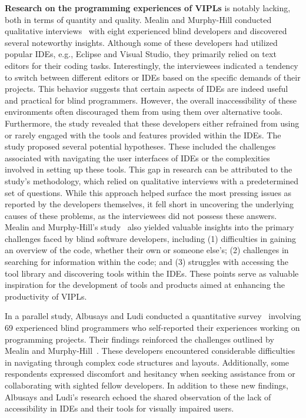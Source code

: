 {\bf Research on the programming experiences of VIPLs} is notably
lacking, both in terms of quantity and quality. Mealin and Murphy-Hill
conducted qualitative interviews~\cite{mealin-vlhcc12} with eight experienced blind
developers and discovered several noteworthy insights. Although some
of these developers had utilized popular IDEs, e.g., Eclipse and
Visual Studio, they primarily relied on text editors for their coding
tasks. Interestingly, the interviewees indicated a tendency to switch
between different editors or IDEs based on the specific demands of
their projects. This behavior suggests that certain aspects of IDEs
are indeed useful and practical for blind programmers. However, the
overall inaccessibility of these environments often discouraged them
from using them over alternative tools.
Furthermore, the study revealed that these developers either refrained
from using or rarely engaged with the tools and features provided
within the IDEs.
The study proposed several potential hypotheses. These included the
challenges associated with navigating the user interfaces of IDEs or
the complexities involved in setting up these tools. This gap in
research can be attributed to the study's methodology, which relied on
qualitative interviews with a predetermined set of questions. While
this approach helped surface the most pressing issues as reported by
the developers themselves, it fell short in uncovering the underlying
causes of these problems, as the interviewees did not possess these
answers.
Mealin and Murphy-Hill's study~\cite{mealin-vlhcc12} also yielded valuable insights into
the primary challenges faced by blind software developers, including
(1) difficulties in gaining an overview of the code, whether their own
or someone else's; (2) challenges in searching for information within
the code; and (3) struggles with accessing the tool library and
discovering tools within the IDEs. These points serve as valuable
inspiration for the development of tools and products aimed at
enhancing the productivity of VIPLs.

In a parallel study, Albusays and Ludi conducted a quantitative survey~\cite{khaled16} involving 69 experienced blind programmers who self-reported their experiences working on programming projects. Their findings reinforced the challenges outlined by Mealin and Murphy-Hill~\cite{mealin-vlhcc12}. These developers encountered considerable difficulties in navigating through complex code structures and layouts. Additionally, some respondents expressed discomfort and hesitancy when seeking assistance from or collaborating with sighted fellow developers. In addition to these new findings, Albusays and Ludi's research echoed the shared observation of the lack of accessibility in IDEs and their tools for visually impaired users.

